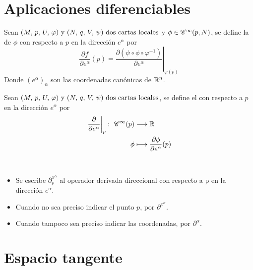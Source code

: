 \section{Aplicaciones diferenciables}\label{sec:aplicaciones-diferenciables}

\begin{definition}
  Sean $(M,\thinspace p,\thinspace U,\thinspace\varphi)\textmd{ y } (N,\thinspace q,\thinspace V,\thinspace\psi)\textmd{ dos cartas locales}$ y $\phi\in\mathscr{C}^\infty(p, N)$, se define la
   de $\phi$ con respecto a $p$ en la dirección $e^\alpha$
  por
  \begin{equation}
    \label{eq:parcial-funcion-punto}
    \frac{\partial f}{\partial e^\alpha}(p)=\left.\frac{\partial (\psi\circ\phi\circ\varphi^{-1})}{\partial
    e^\alpha}\right|_{\varphi(p)}
  \end{equation}
  Donde $(e^\alpha)_\alpha$ son las coordenadas canónicas de $\mathbb{R}^n$.
\end{definition}

\begin{definition}
  Sean $(M,\thinspace p,\thinspace U,\thinspace\varphi)\textmd{ y } (N,\thinspace q,\thinspace V,\thinspace\psi)\textmd{ dos cartas locales}$, se define el
   con
  respecto a $p$ en la dirección $e^\alpha$ por
  \begin{equation}
    \begin{alignedat}{1}
      \label{eq:operador-parcial-funcion-punto}
      \left.\frac{\partial}{\partial e^\alpha}\right|_p:\ \mathscr{C}^\infty(p) & \longrightarrow \mathbb{R} \\ \phi & \longmapsto \frac{\partial
      \phi}{\partial e^\alpha}(p)
    \end{alignedat}
  \end{equation}
\end{definition}
\begin{notation}
  \
  \begin{itemize}
    \item Se escribe $\partial^{x^\alpha}_p$ al operador derivada direccional con respecto a p en la dirección
    $e^\alpha$.
    \item Cuando no sea preciso indicar el punto $p$, por $\partial^{x^\alpha}$.
    \item Cuando tampoco sea preciso indicar las coordenadas, por $\partial^\alpha$.
  \end{itemize}
\end{notation}


\section{Espacio tangente}\label{sec:espacio-tangente}



